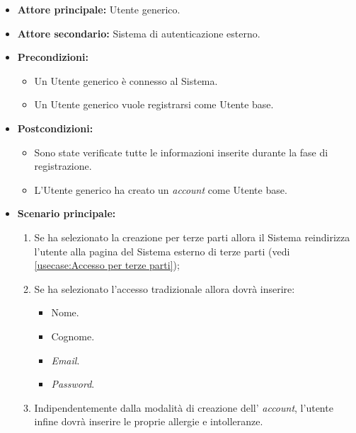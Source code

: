 \label{usecase:Registrazione Utente base}
\begin{itemize}

	\item \textbf{Attore principale:} Utente generico.
	\item \textbf{Attore secondario:} Sistema di autenticazione esterno.

	\item \textbf{Precondizioni:} 
	\begin{itemize}
        \item  Un Utente generico è connesso al Sistema.
        \item  Un Utente generico vuole registrarsi come Utente base.
    \end{itemize}
    

	\item \textbf{Postcondizioni:} 
    \begin{itemize}
        \item  Sono state verificate tutte le informazioni inserite durante la fase di registrazione.
        \item  L'Utente generico ha creato un \textit{account} come Utente base.
    \end{itemize}

	\item \textbf{Scenario principale:}
	\begin{enumerate}

            \item Se ha selezionato la creazione per terze parti allora il Sistema reindirizza l'utente alla pagina del Sistema esterno di terze parti (vedi \autoref{usecase:Accesso per terze parti});
            \item Se ha selezionato l'accesso tradizionale allora dovrà inserire:
            \begin{itemize}
                \item Nome.
                \item Cognome.
                \item \textit{Email}.
                \item \textit{Password}.
            \end{itemize}
            \item Indipendentemente dalla modalità di creazione dell' \textit{account}, l'utente infine dovrà inserire le proprie allergie e intolleranze.
            
	\end{enumerate}
	
\end{itemize}

